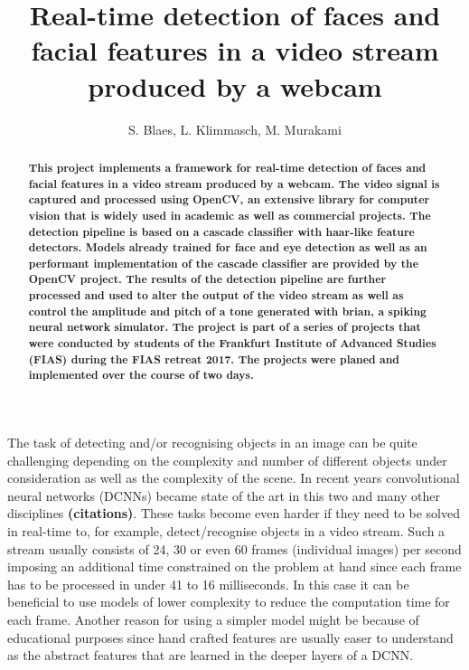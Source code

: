 \documentclass[11pt,a4paper]{article}
\begin{document}
\title{Real-time detection of faces and facial features in a video stream produced by a webcam}
\author{S. Blaes, L. Klimmasch, M. Murakami}
\date{}

\maketitle

\begin{abstract}
\bfseries{
\noindent This project implements a framework for real-time detection of faces and facial features in a video stream produced by a webcam. The video signal is captured and processed using OpenCV, an extensive library for computer vision that is widely used in academic as well as commercial projects. The detection pipeline is based on a cascade classifier with haar-like feature detectors. Models already trained for face and eye detection as well as an performant implementation of the cascade classifier are provided by the OpenCV project. The results of the detection pipeline are further processed and used to alter the output of the video stream as well as control the amplitude and pitch of a tone generated with brian, a spiking neural network simulator. The project is part of a series of projects that were conducted by students of the Frankfurt Institute of Advanced Studies (FIAS) during the FIAS retreat 2017. The projects were planed and implemented over the course of two days. 
}
\end{abstract}

\vspace{1.5cm}

The task of detecting and/or recognising objects in an image can be quite challenging depending on the complexity and number of different objects under consideration as well as the complexity of the scene. In recent years convolutional neural networks (DCNNs) became state of the art in this two and many other disciplines \textbf{(citations)}. These tasks become even harder if they need to be solved in real-time to, for example, detect/recognise objects in a video stream. Such a stream usually consists of 24, 30 or even 60 frames (individual images) per second imposing an additional time constrained on the problem at hand since each frame has to be processed in under 41 to 16 milliseconds. In this case it can be beneficial to use models of lower complexity to reduce the computation time for each frame. Another reason for using a simpler model might be because of educational purposes since hand crafted features are usually easer to understand as the abstract features that are learned in the deeper layers of a DCNN. 
\end{document}
